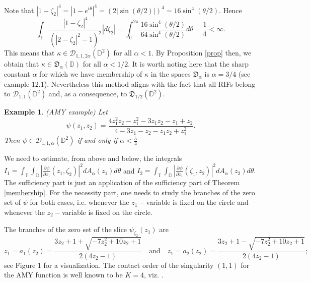 \documentclass[11pt]{amsart}
\newtheorem{example}[theorem]{Example}
\numberwithin{equation}{section}
\begin{document}
Note that $|1-\zeta_2|^4=|1-e^{i\theta}|^4=(2|\sin(\theta/2)|)^4=16\sin^{4}(\theta/2).$ Hence
$$\int_{\mathbb{T}}\frac{|1-\zeta_2|^4}{(|2-\zeta_2|^2-1)^2}|d\zeta_2|=\int_{0}^{2\pi}\frac{16\sin^4(\theta/2)}{64\sin^4(\theta/2)}d\theta=\frac{1}{4}<\infty.$$
This means that $\kappa\in\mathcal{D}_{1,1,2\alpha}(\mathbb{D}^2)$ for all $\alpha<1.$ By Proposition \ref{prop} then, we obtain that $\kappa\in \mathfrak{D}_{\alpha}(\mathbb{D})$ for all $\alpha<1/2.$
It is worth noting here that the sharp constant $\alpha$ for which we have membership of $\kappa$ in the spaces $\mathfrak{D}_{\alpha}$ is $\alpha=3/4$ (see  \cite{PLMS} example 12.1). Nevertheless this method aligns with the fact that all RIFs belong to $\mathcal{D}_{1,1}(\mathbb{D}^2)$ and, as a consequence, to $\mathfrak{D}_{1/2}(\mathbb{D}^2).$
\begin{example} (AMY example) Let $$\psi(z_1,z_2)=\frac{4z_1^2z_2-z_1^2-3z_1z_2-z_1+z_2}{4-3z_1-z_2-z_1z_2+z_1^2}.$$ Then $\psi\in \mathcal{D}_{1,1,\alpha}(\mathbb{D}^2)$ if and only if $\alpha<\frac{5}{4}$
\end{example}
We need to estimate, from above and below, the integrals 
$I_1=\int_{\mathbb{T}}\int_{\mathbb{D}}\left|\frac{\partial \psi}{\partial z_1}(z_1,\zeta_2)\right|^2dA_{\alpha}(z_1)d\theta$ and $I_2=\int_{\mathbb{T}}\int_{\mathbb{D}}\left|\frac{\partial \psi}{\partial z_1}(\zeta_1,z_2)\right|^2dA_{\alpha}(z_2)d\theta.$ The sufficiency part is just an application of the sufficiency part of Theorem \ref{membership}. For the necessity part, one needs to study the branches of the zero set of $\psi$ for both cases, i.e. whenever the $z_1-$variable is fixed on the circle and whenever the $z_2-$variable is fixed on the circle.


The branches of the zero set of the slice $\psi_{\zeta_2}(z_1)$ are
\[z_1=a_1(z_2)=\frac{3z_2+1 + \sqrt{-7z_2^2+10z_2+1}}{2(4z_2-1)}\quad 
\textrm{and} \quad 
z_1=a_2(z_2)=\frac{3z_2+1 - \sqrt{-7z_2^2+10z_2+1}}{2(4z_2-1)};\]
see Figure 1 for a visualization.
The contact order of the singularity $(1,1)$ for the AMY function is well known to be $K=4$, viz. \cite[Example 2]{PLMS}.
\end{document}
